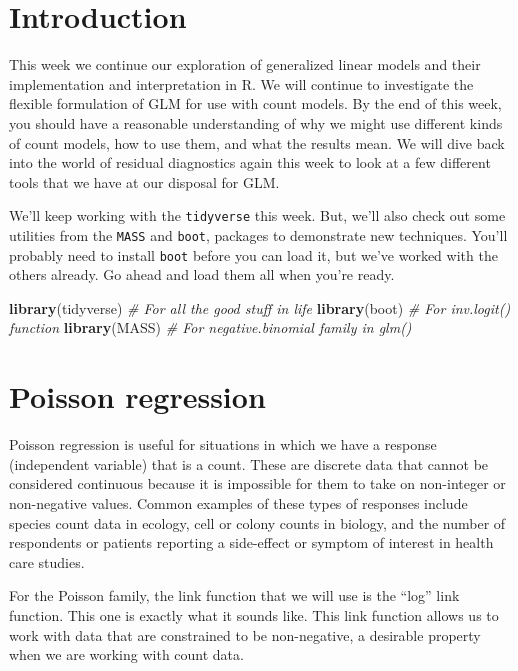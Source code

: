 \documentclass[
]{book}
\newenvironment{Shaded}{\begin{snugshade}}{\end{snugshade}}
\newcommand{\CommentTok}[1]{\textcolor[rgb]{0.56,0.35,0.01}{\textit{#1}}}
\newcommand{\KeywordTok}[1]{\textcolor[rgb]{0.13,0.29,0.53}{\textbf{#1}}}
\newcommand{\NormalTok}[1]{#1}
\begin{document}
\hypertarget{intro13}{%
\section{Introduction}\label{intro13}}

This week we continue our exploration of generalized linear models and their implementation and interpretation in R. We will continue to investigate the flexible formulation of GLM for use with count models. By the end of this week, you should have a reasonable understanding of why we might use different kinds of count models, how to use them, and what the results mean. We will dive back into the world of residual diagnostics again this week to look at a few different tools that we have at our disposal for GLM.

We'll keep working with the \texttt{tidyverse} this week. But, we'll also check out some utilities from the \texttt{MASS} and \texttt{boot}, packages to demonstrate new techniques. You'll probably need to install \texttt{boot} before you can load it, but we've worked with the others already. Go ahead and load them all when you're ready.

\begin{Shaded}
\begin{Highlighting}[]
\KeywordTok{library}\NormalTok{(tidyverse) }\CommentTok{# For all the good stuff in life}
\KeywordTok{library}\NormalTok{(boot) }\CommentTok{# For inv.logit() function}
\KeywordTok{library}\NormalTok{(MASS) }\CommentTok{# For negative.binomial family in glm()}
\end{Highlighting}
\end{Shaded}

\hypertarget{poisson-regression}{%
\section{Poisson regression}\label{poisson-regression}}

Poisson regression is useful for situations in which we have a response (independent variable) that is a count. These are discrete data that cannot be considered continuous because it is impossible for them to take on non-integer or non-negative values. Common examples of these types of responses include species count data in ecology, cell or colony counts in biology, and the number of respondents or patients reporting a side-effect or symptom of interest in health care studies.

For the Poisson family, the link function that we will use is the ``log'' link function. This one is exactly what it sounds like. This link function allows us to work with data that are constrained to be non-negative, a desirable property when we are working with count data.
\end{document}
